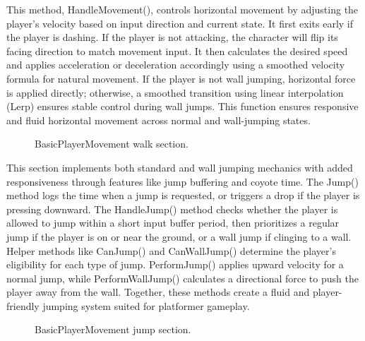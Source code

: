 \documentclass[12pt,oneside,openright,a4paper]{cpe-english-project}
\begin{document}
\newpage
This method, HandleMovement(), controls horizontal movement by adjusting the player's velocity based on input direction and current state. It first exits early if the player is dashing. If the player is not attacking, the character will flip its facing direction to match movement input. It then calculates the desired speed and applies acceleration or deceleration accordingly using a smoothed velocity formula for natural movement. If the player is not wall jumping, horizontal force is applied directly; otherwise, a smoothed transition using linear interpolation (Lerp) ensures stable control during wall jumps. This function ensures responsive and fluid horizontal movement across normal and wall-jumping states.\par
 \begin{figure}[!h]
 \centering
\caption{BasicPlayerMovement walk section.}\label{fig:walk}
\end{figure}
This section implements both standard and wall jumping mechanics with added responsiveness through features like jump buffering and coyote time. The Jump() method logs the time when a jump is requested, or triggers a drop if the player is pressing downward. The HandleJump() method checks whether the player is allowed to jump within a short input buffer period, then prioritizes a regular jump if the player is on or near the ground, or a wall jump if clinging to a wall. Helper methods like CanJump() and CanWallJump() determine the player's eligibility for each type of jump. PerformJump() applies upward velocity for a normal jump, while PerformWallJump() calculates a directional force to push the player away from the wall. Together, these methods create a fluid and player-friendly jumping system suited for platformer gameplay.\par
 \begin{figure}[!h]
 \centering
\caption{BasicPlayerMovement jump section.}\label{fig:jump}
\end{figure}
\end{document}
